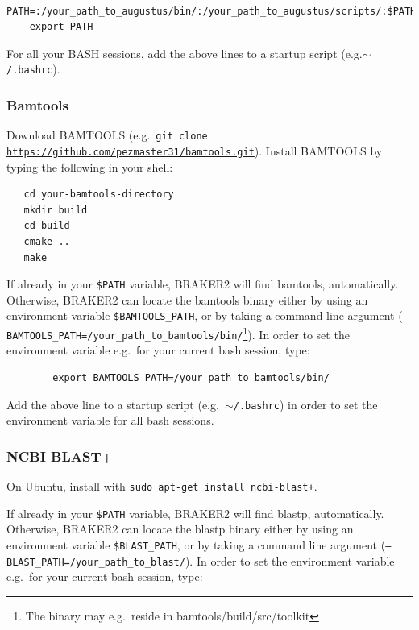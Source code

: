 \documentclass[a4paper,10pt]{report}
\begin{document}
    \begin{verbatim}
    PATH=:/your_path_to_augustus/bin/:/your_path_to_augustus/scripts/:$PATH
    export PATH
    \end{verbatim}

    For all your BASH sessions, add the above lines to a startup script (e.g.\texttt{$\sim$/.bashrc}).

   

\subsubsection{Bamtools}

Download BAMTOOLS (e.g.~\texttt{git clone \url{https://github.com/pezmaster31/bamtools.git}}). Install BAMTOOLS by typing the following in your shell:\\

 \begin{verbatim}
   cd your-bamtools-directory
   mkdir build
   cd build
   cmake ..
   make
 \end{verbatim}

 If already in your \texttt{\$PATH} variable, BRAKER2 will find bamtools, automatically. Otherwise, BRAKER2 can locate the bamtools binary either by using an environment variable \texttt{\$BAMTOOLS\_PATH}, or by taking a command line argument (\texttt{--BAMTOOLS\_PATH=/your\_path\_to\_bamtools/bin/}\footnote{The binary may e.g.~reside in bamtools/build/src/toolkit}). In order to set the environment variable e.g.~for your current bash session, type:

    \begin{verbatim}
        export BAMTOOLS_PATH=/your_path_to_bamtools/bin/ 
    \end{verbatim} 

    Add the above line to a startup script (e.g.~\texttt{$\sim$/.bashrc}) in order to set the environment variable for all bash sessions.

    
\subsubsection{NCBI BLAST+}

On Ubuntu, install with \texttt{sudo apt-get install ncbi-blast+}.

If already in your \texttt{\$PATH} variable, BRAKER2 will find blastp, automatically. Otherwise, BRAKER2 can locate the blastp binary either by using an environment variable \texttt{\$BLAST\_PATH}, or by taking a command line argument (\texttt{--BLAST\_PATH=/your\_path\_to\_blast/}). In order to set the environment variable e.g.~for your current bash session, type:
\end{document}
